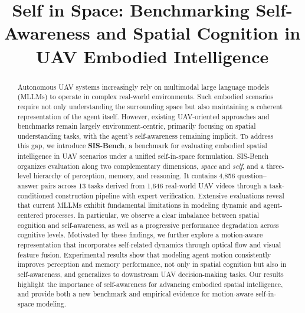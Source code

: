 \documentclass[sigconf, screen, review, anonymous]{acmart}
\begin{document}
\title{Self in Space: Benchmarking Self-Awareness and Spatial Cognition in UAV Embodied Intelligence}






\renewcommand{\shortauthors}{Trovato et al.}





\begin{abstract}
Autonomous UAV systems increasingly rely on multimodal large language models (MLLMs) to operate in complex real-world environments. Such embodied scenarios require not only understanding the surrounding space but also maintaining a coherent representation of the agent itself. However, existing UAV-oriented approaches and benchmarks remain largely environment-centric, primarily focusing on spatial understanding tasks, with the agent's self-awareness remaining implicit. To address this gap, we introduce \textbf{SIS-Bench}, a benchmark for evaluating embodied spatial intelligence in UAV scenarios under a unified self-in-space formulation. SIS-Bench organizes evaluation along two complementary dimensions, \emph{space} and \emph{self}, and a three-level hierarchy of perception, memory, and reasoning. It contains 4,856 question--answer pairs across 13 tasks derived from 1,646 real-world UAV videos through a task-conditioned construction pipeline with expert verification.
Extensive evaluations reveal that current MLLMs exhibit fundamental limitations in modeling dynamic and agent-centered processes. In particular, we observe a clear imbalance between spatial cognition and self-awareness, as well as a progressive performance degradation across cognitive levels.
Motivated by these findings, we further explore a motion-aware representation that incorporates self-related dynamics through optical flow and visual feature fusion. Experimental results show that modeling agent motion consistently improves perception and memory performance, not only in spatial cognition but also in self-awareness, and generalizes to downstream UAV decision-making tasks.
Our results highlight the importance of self-awareness for advancing embodied spatial intelligence, and provide both a new benchmark and empirical evidence for motion-aware self-in-space modeling.

\end{abstract}
\end{document}
